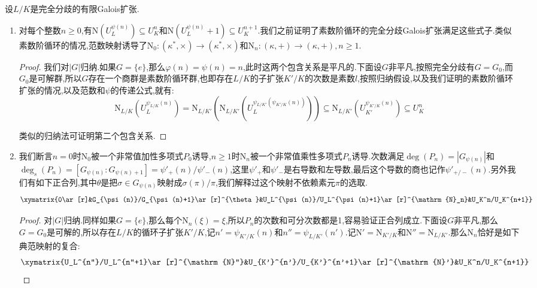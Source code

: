 设$L/K$是完全分歧的有限Galois扩张.
\begin{enumerate}
	\item 对每个整数$n\ge0$,有$\mathrm{N}(U_L^{\psi(n)})\subseteq U_K^n$和$\mathrm{N}(U_L^{\psi(n)}+1)\subseteq U_K^{n+1}$.我们之前证明了素数阶循环的完全分歧Galois扩张满足这些式子.类似素数阶循环的情况,范数映射诱导了$\mathrm{N}_0:(\kappa^*,\times)\to(\kappa^*,\times)$和$\mathrm{N}_n:(\kappa,+)\to(\kappa,+),n\ge1$.
	\begin{proof}
		
		我们对$|G|$归纳.如果$G=\{e\}$,那么$\varphi(n)=\psi(n)=n$,此时这两个包含关系是平凡的.下面设$G$非平凡,按照完全分歧有$G=G_0$,而$G_0$是可解群,所以$G$存在一个商群是素数阶循环群,也即存在$L/K$的子扩张$K'/K$的次数是素数$l$,按照归纳假设,以及我们证明的素数阶循环扩张的情况,以及范数和$\psi$的传递公式,就有:
		$$\mathrm{N}_{L/K}(U_L^{\psi_{L/K}(n)})=\mathrm{N}_{L/K'}\left(\mathrm{N}_{L/K'}(U_L^{\psi_{L/K'}(\psi_{K'/K}(n))})\right)\subseteq\mathrm{N}_{L/K'}\left(U_{K'}^{\psi_{K'/K}(n)}\right)\subseteq U_K^n$$
		
		类似的归纳法可证明第二个包含关系.
	\end{proof}
	\item 我们断言$n=0$时$\mathrm{N}_0$被一个非常值加性多项式$P_0$诱导,$n\ge1$时$\mathrm{N}_n$被一个非常值乘性多项式$P_n$诱导.次数满足$\deg(P_n)=|G_{\psi(n)}|$和$\deg_s(P_n)=[G_{\psi(n)}:G_{\psi(n)+1}]=\psi'_+(n)/\psi'_-(n)$,这里$\psi'_+$和$\psi'_-$是右导数和左导数,最后这个导数的商也记作$\psi'_{+/-}(n)$.另外我们有如下正合列,其中$\theta$是把$\sigma\in G_{\psi(n)}$映射成$\sigma(\pi)/\pi$,我们解释过这个映射不依赖素元$\pi$的选取.
	$$\xymatrix{0\ar[r]&G_{\psi(n)}/G_{\psi(n)+1}\ar[r]^{\theta}&U_L^{\psi(n)}/U_L^{\psi(n)+1}\ar[r]^{\mathrm{N}_n}&U_K^n/U_K^{n+1}}$$
	\begin{proof}
		
		对$|G|$归纳.同样如果$G=\{e\}$,那么每个$\mathrm{N}_n(\xi)=\xi$,所以$P_n$的次数和可分次数都是1,容易验证正合列成立.下面设$G$非平凡,那么$G=G_0$是可解的,所以存在$L/K$的循环子扩张$K'/K$,记$n'=\psi_{K'/K}(n)$和$n''=\psi_{L/K'}(n')$.记$\mathrm{N}'=\mathrm{N}_{K'/K}$和$\mathrm{N}''=\mathrm{N}_{L/K'}$.那么$\mathrm{N}_n$恰好是如下典范映射的复合:
		$$\xymatrix{U_L^{n''}/U_L^{n''+1}\ar[r]^{\mathrm{N}''}&U_{K'}^{n'}/U_{K'}^{n'+1}\ar[r]^{\mathrm{N}'}&U_K^n/U_K^{n+1}}$$
		

\end{proof}
\end{enumerate}

